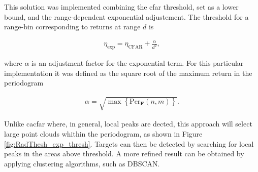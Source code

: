 	This solution was implemented combining the \gls{cfar} threshold, set as a lower bound, and the range-dependent exponential adjustement.
	The threshold for a range-bin corresponding to returns at range $d$ is
	
	\begin{align*}
		\eta_{\text{exp}} = \eta_{\text{CFAR}} + \frac{\alpha}{d^2},
	\end{align*} 
	
	where $\alpha$ is an adjustment factor for the exponential term. For this particular implementation it was defined as the square root of the maximum return in the periodogram
	
	\begin{align*}
		\alpha = \sqrt{\max{ \left\{\text{Per}_{\mathbf F}(n,m)\right\} }}.
	\end{align*}
	
	Unlike \gls{cacfar} where, in general, local peaks are dected, this approach will select large point clouds whithin the periodogram, as shown in Figure \ref{fig:RadThesh_exp_thresh}.
	Targets can then be detected by searching for local peaks in the areas above threshold. A more refined result can be obtained by applying clustering algorithms, such as DBSCAN.
	
